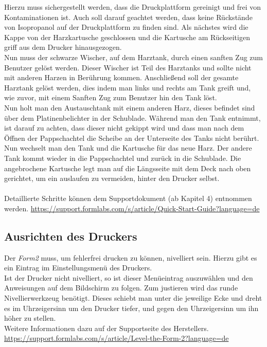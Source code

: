 \documentclass{\basedir/fablab-document}
\begin{document}
Hierzu muss sichergestellt werden, dass die Druckplattform gereinigt und frei von Kontaminationen ist. Auch soll darauf geachtet werden, dass keine Rückstände von Isopropanol auf der Druckplattform zu finden sind. Als nächstes wird die Kappe von der Harzkartusche geschlossen und die Kartusche am Rückseitigen griff aus dem Drucker hinausgezogen.\\
Nun muss der schwarze Wischer, auf dem Harztank, durch einen sanften Zug zum Benutzer gelöst werden. Dieser Wischer ist Teil des Harztanks und sollte nicht mit anderen Harzen in Berührung kommen. Anschließend soll der gesamte Harztank gelöst werden, dies indem man links und rechts am Tank greift und, wie zuvor, mit einem Sanften Zug zum Benutzer hin den Tank löst. \\
Nun holt man den Austauschtank mit einem anderen Harz, dieses befindet sind über dem Platinenbelichter in der Schublade. Während man den Tank entnimmt, ist darauf zu achten, dass dieser nicht gekippt wird und dass man nach dem Öffnen der Pappschachtel die Scheibe an der Unterseite des Tanks nicht berührt. \\
Nun wechselt man den Tank und die Kartusche für das neue Harz. Der andere Tank kommt wieder in die Pappschachtel und zurück in die Schublade. Die angebrochene Kartusche legt man auf die Längsseite mit dem Deck nach oben gerichtet, um ein auslaufen zu vermeiden, hinter den Drucker selbst. \\
\\
Detaillierte Schritte können dem Supportdokument (ab Kapitel 4) entnommen werden. 
\url{https://support.formlabs.com/s/article/Quick-Start-Guide?language=de}


\subsection{Ausrichten des Druckers}
Der \textit{Form2} muss, um fehlerfrei drucken zu können, nivelliert sein. Hierzu gibt es ein Eintrag im Einstellungsmenü des Druckers.\\
Ist der Drucker nicht nivelliert, so ist dieser Menüeintrag auszuwählen und den Anweisungen auf dem Bildschirm zu folgen. Zum justieren wird das runde Nivellierwerkzeug benötigt. Dieses schiebt man unter die jeweilige Ecke und dreht es im Uhrzeigersinn um den Drucker tiefer, und gegen den Uhrzeigersinn um ihn höher zu stellen.\\
Weitere Informationen dazu auf der Supportseite des Herstellers.	\\
\url{https://support.formlabs.com/s/article/Level-the-Form-2?language=de}
\end{document}
